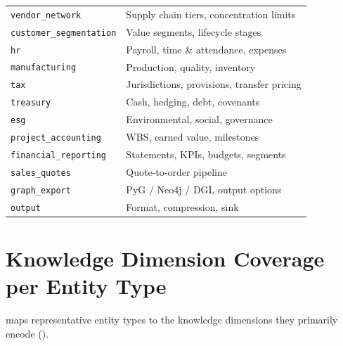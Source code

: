 \begin{table}[H]
\begin{tabular}{lp{8cm}}
\texttt{vendor\_network}       & Supply chain tiers, concentration limits \\
\texttt{customer\_segmentation}& Value segments, lifecycle stages \\
\texttt{hr}                    & Payroll, time \& attendance, expenses \\
\texttt{manufacturing}         & Production, quality, inventory \\
\texttt{tax}                   & Jurisdictions, provisions, transfer pricing \\
\texttt{treasury}              & Cash, hedging, debt, covenants \\
\texttt{esg}                   & Environmental, social, governance \\
\texttt{project\_accounting}   & WBS, earned value, milestones \\
\texttt{financial\_reporting}  & Statements, KPIs, budgets, segments \\
\texttt{sales\_quotes}         & Quote-to-order pipeline \\
\texttt{graph\_export}         & PyG / Neo4j / DGL output options \\
\texttt{output}                & Format, compression, sink \\
\bottomrule
\end{tabular}
\end{table}

\section{Knowledge Dimension Coverage per Entity Type}
\label{app:knowledge_dimensions}

 maps representative entity types to the
knowledge dimensions they primarily encode
().


